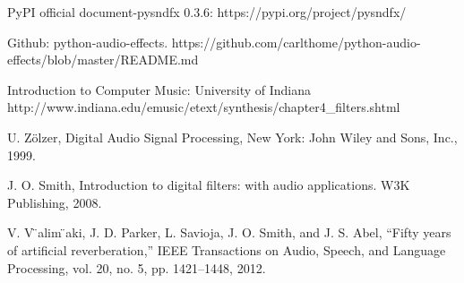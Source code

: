 \documentclass[runningheads,a4paper]{llncs}
\begin{document}
\begin{thebibliography}{4}








 PyPI official document-pysndfx 0.3.6: https://pypi.org/project/pysndfx/ 

 Github: python-audio-effects. https://github.com/carlthome/python-audio-effects/blob/master/README.md

 Introduction to Computer Music: University of Indiana
http://www.indiana.edu/emusic/etext/synthesis/chapter4_filters.shtml

 U. Zölzer, Digital Audio Signal Processing, 
New York: John Wiley and Sons, Inc., 1999.

 J. O. Smith, Introduction to digital filters: with audio applications. W3K Publishing, 2008.

 V. V ̈alim ̈aki, J. D. Parker, L. Savioja, J. O. Smith, and J. S. Abel, “Fifty years of artificial reverberation,” IEEE Transactions on Audio, Speech, and Language Processing, vol. 20, no. 5, pp. 1421–1448, 2012.


\end{thebibliography}



\end{document}
